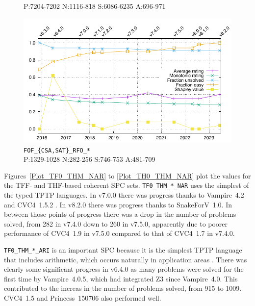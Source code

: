 \documentclass[runningheads]{llncs}
\begin{document}
\begin{figure}[b!]
\begin{minipage}[t]{.49\textwidth}
{           {\scriptsize P:7204-7202 N:1116-818 S:6086-6235 A:696-971}}
  \label{Plot_FOF_THM_RFO}
\end{minipage}
\begin{minipage}[t]{.49\textwidth}
  \centering
  \includegraphics[width=\textwidth]{Plots/GNUPlots/FOF_CSA_SAT_RFO.pdf}
  \vspace*{-2em}
  \caption{{\tt FOF\_\{CSA,SAT\}\_RFO\_*} \\
           {\scriptsize P:1329-1028 N:282-256 S:746-753 A:481-709}}
  \label{Plot_FOF_CSA_SAT_RFO}
\end{minipage}
\end{figure}

Figures~\ref{Plot_TF0_THM_NAR} to \ref{Plot_TH0_THM_NAR} plot the values for the TFF- and
THF-based coherent SPC sets.
{\tt TF0\_THM\_*\_NAR} uses the simplest of the typed TPTP languages.
In v7.0.0 there was progress thanks to Vampire~4.2 and CVC4~1.5.2 \cite{BC+11}.
In v8.2.0 there was progress thanks to SnakeForV~1.0.
In between those points of progress there was a drop in the number of problems solved, from
282 in v7.4.0 down to 260 in v7.5.0, apparently due to poorer performance of CVC4~1.9
in v7.5.0 compared to that of CVC4~1.7 in v7.4.0.

{\tt TF0\_THM\_*\_ARI} is an important SPC because it is the simplest TPTP language that 
includes arithmetic, which occurs naturally in application areas \cite{KK+23,BF+15,PB10}.
There was clearly some significant progress in v6.4.0 as many problems were solved for the
first time by Vampire~4.0.5, which had integrated Z3 \cite{dMB08} since Vampire~4.0.
This contributed to the increas in the number of problems solved, from 915 to 1009.
CVC4~1.5 \cite{BC+11} and Princess~150706 \cite{Rue08} also performed well.
\end{document}
